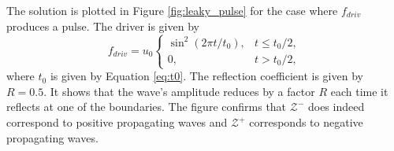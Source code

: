 The solution is plotted in Figure \ref{fig:leaky_pulse} for the case where $f_{driv}$ produces a pulse. The driver is given by
\begin{equation}
    \label{eq:f_driv_leaky_pulse}
    f_{driv} = u_0\begin{cases}
    \sin^2(2\pi t / t_0), & t \le t_0 / 2,  \\
    0, & t > t_0 / 2,
    \end{cases}
\end{equation}
where $t_0$ is given by Equation \eqref{eq:t0}. The reflection coefficient is given by $R=0.5$. It shows that the wave's amplitude reduces by a factor $R$ each time it reflects at one of the boundaries. The figure confirms that $\mathcal{Z}^-$ does indeed correspond to positive propagating waves and $\mathcal{Z}^+$ corresponds to negative propagating waves.

